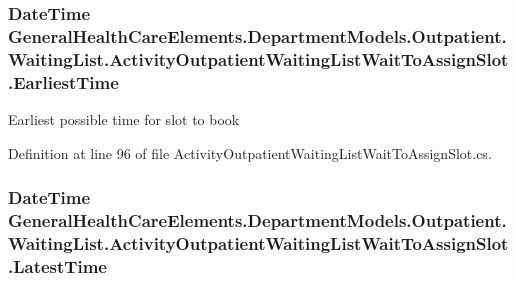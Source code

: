 \subsubsection[{\texorpdfstring{Earliest\+Time}{EarliestTime}}]{\setlength{\rightskip}{0pt plus 5cm}Date\+Time General\+Health\+Care\+Elements.\+Department\+Models.\+Outpatient.\+Waiting\+List.\+Activity\+Outpatient\+Waiting\+List\+Wait\+To\+Assign\+Slot.\+Earliest\+Time\hspace{0.3cm}{\ttfamily [get]}}\hypertarget{class_general_health_care_elements_1_1_department_models_1_1_outpatient_1_1_waiting_list_1_1_act8586a0b22c75d36396c6c75291998c21_a6d6c7757c5bbd375764dd9edab2eeb92}{}\label{class_general_health_care_elements_1_1_department_models_1_1_outpatient_1_1_waiting_list_1_1_act8586a0b22c75d36396c6c75291998c21_a6d6c7757c5bbd375764dd9edab2eeb92}


Earliest possible time for slot to book 



Definition at line 96 of file Activity\+Outpatient\+Waiting\+List\+Wait\+To\+Assign\+Slot.\+cs.

\subsubsection[{\texorpdfstring{Latest\+Time}{LatestTime}}]{\setlength{\rightskip}{0pt plus 5cm}Date\+Time General\+Health\+Care\+Elements.\+Department\+Models.\+Outpatient.\+Waiting\+List.\+Activity\+Outpatient\+Waiting\+List\+Wait\+To\+Assign\+Slot.\+Latest\+Time\hspace{0.3cm}{\ttfamily [get]}}\hypertarget{class_general_health_care_elements_1_1_department_models_1_1_outpatient_1_1_waiting_list_1_1_act8586a0b22c75d36396c6c75291998c21_a4e418eabf74c33c72548ce53166fa224}{}\label{class_general_health_care_elements_1_1_department_models_1_1_outpatient_1_1_waiting_list_1_1_act8586a0b22c75d36396c6c75291998c21_a4e418eabf74c33c72548ce53166fa224}


